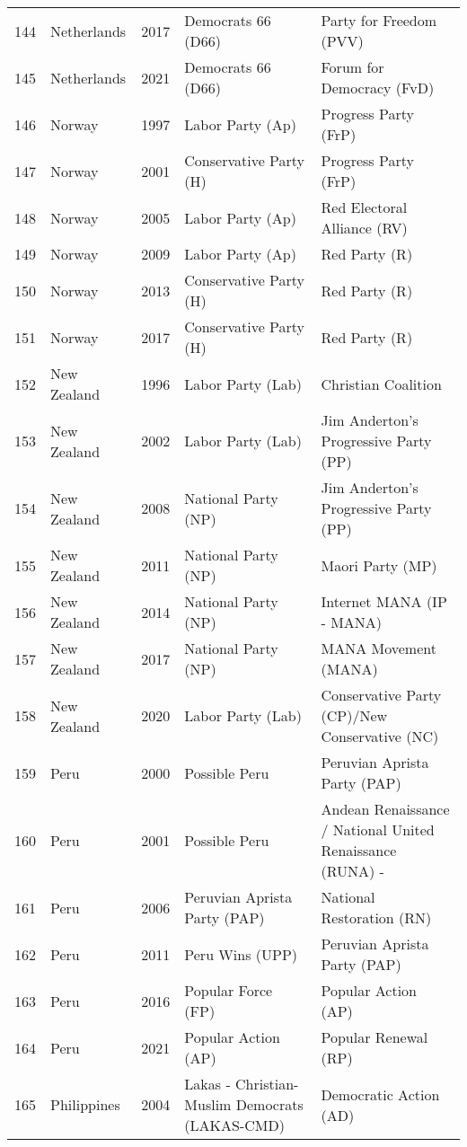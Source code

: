 \documentclass[12pt]{article}
\begin{document}
\begin{table}[ht]
\begin{footnotesize}
\begin{tabular}{rllll}
  144 & Netherlands & 2017 &   Democrats 66 (D66) &   Party for Freedom (PVV) \\ 
  145 & Netherlands & 2021 &   Democrats 66 (D66) &   Forum for Democracy (FvD) \\ 
  146 & Norway & 1997 &   Labor Party (Ap) &   Progress Party (FrP) \\ 
  147 & Norway & 2001 &   Conservative Party (H) &   Progress Party (FrP) \\ 
  148 & Norway & 2005 &   Labor Party (Ap) &   Red Electoral Alliance (RV) \\ 
  149 & Norway & 2009 &   Labor Party (Ap) &   Red Party (R) \\ 
  150 & Norway & 2013 &   Conservative Party (H) &   Red Party (R) \\ 
  151 & Norway & 2017 &   Conservative Party (H) &   Red Party (R) \\ 
  152 & New Zealand & 1996 &   Labor Party (Lab) &   Christian Coalition \\ 
  153 & New Zealand & 2002 &   Labor Party (Lab) &   Jim Anderton's Progressive Party (PP) \\ 
  154 & New Zealand & 2008 &   National Party (NP) &   Jim Anderton's Progressive Party (PP) \\ 
  155 & New Zealand & 2011 &   National Party (NP) &   Maori Party (MP) \\ 
  156 & New Zealand & 2014 &   National Party (NP) &   Internet MANA (IP - MANA) \\ 
  157 & New Zealand & 2017 &   National Party (NP) &   MANA Movement (MANA) \\ 
  158 & New Zealand & 2020 &   Labor Party (Lab) &   Conservative Party (CP)/New Conservative (NC) \\ 
  159 & Peru & 2000 &   Possible Peru &   Peruvian Aprista Party (PAP) \\ 
  160 & Peru & 2001 &   Possible Peru &   Andean Renaissance / National United Renaissance (RUNA) - \\ 
  161 & Peru & 2006 &   Peruvian Aprista Party (PAP) &   National Restoration (RN) \\ 
  162 & Peru & 2011 &   Peru Wins (UPP) &   Peruvian Aprista Party (PAP) \\ 
  163 & Peru & 2016 &   Popular Force (FP) &   Popular Action (AP) \\ 
  164 & Peru & 2021 &   Popular Action (AP) &   Popular Renewal (RP) \\ 
  165 & Philippines & 2004 &   Lakas - Christian-Muslim Democrats (LAKAS-CMD) &   Democratic Action (AD) \\ 

\end{tabular}
\end{footnotesize}
\end{table}
\end{document}
